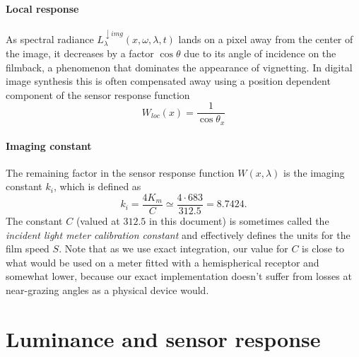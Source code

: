 \paragraph{Local response}
As spectral radiance $L^{\downarrow img}_{\lambda}(x, \omega, \lambda, t)$ lands
on a pixel away from the center of the image, it decreases by a factor
$\cos\theta$ due to its angle of incidence on the filmback, a phenomenon that
dominates the appearance of vignetting. In digital image synthesis this is often
compensated away using a position dependent component of the sensor response
function
\begin{equation}
W_{loc}(x) = \frac{1}{\cos\theta_x}
\end{equation}

\paragraph{Imaging constant}

The remaining factor in the sensor response function $W(x,\lambda)$ is the
imaging constant $k_i$, which is defined as
\begin{equation}\label{eqn:imaging_ki}
 k_i = \frac{4K_m}{C} \simeq \frac{4\cdot683}{312.5} = 8.7424.
\end{equation}
The constant $C$ (valued at $312.5$ in this document) is sometimes called the \textsl{incident light meter
calibration constant} and effectively defines the units for the film speed $S$.
Note that as we use exact integration, our value for $C$ is close to what would be used on a meter fitted with a hemispherical receptor and somewhat lower, because our exact implementation doesn't suffer from losses at near-grazing angles as a physical device would.


\section{Luminance and sensor response}

